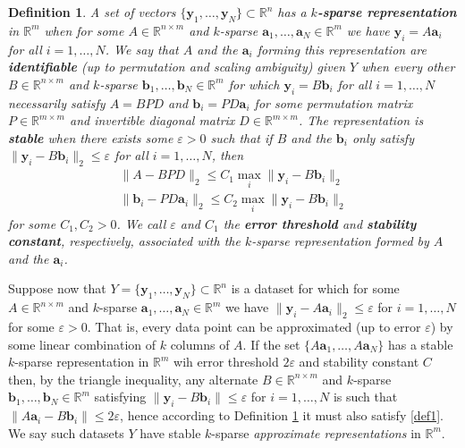 \documentclass[journal, onecolumn]{IEEEtran}
\newtheorem{definition}{Definition}
\begin{document}
\begin{definition}\label{Uniqueness}
A set of vectors $\{\mathbf{y}_1, \ldots, \mathbf{y}_N\} \subset \mathbb{R}^n$ has a \textbf{$k$-sparse representation} in $\mathbb{R}^m$ when for some $A \in \mathbb{R}^{n \times m}$ and $k$-sparse $\mathbf{a}_1, \ldots, \mathbf{a}_N \in \mathbb{R}^m$ we have $\mathbf{y}_i = A\mathbf{a}_i$ for all $i = 1, \ldots, N$. We say that $A$ and the $\mathbf{a}_i$ forming this representation are \textbf{identifiable} (up to permutation and scaling ambiguity) given $Y$ when every other $B \in \mathbb{R}^{n \times m}$ and $k$-sparse $\mathbf{b}_1, \ldots, \mathbf{b}_N \in \mathbb{R}^m$ for which $\mathbf{y}_i = B\mathbf{b}_i$ for all $i = 1, \ldots, N$ necessarily satisfy $A = BPD$ and $\mathbf{b}_i = PD\mathbf{a}_i$ for some permutation matrix $P \in \mathbb{R}^{m \times m}$ and invertible diagonal matrix $D \in \mathbb{R}^{m \times m}$. The representation is \textbf{stable} when there exists some $\varepsilon > 0$ such that if $B$ and the $\mathbf{b}_i$ only satisfy $\|\mathbf{y}_i - B\mathbf{b}_i\|_2 \leq \varepsilon$ for all $i = 1, \ldots, N$, then
\begin{align}\label{def1}
\|A - BPD\|_2 \leq C_1 \max_i \|\mathbf{y}_i - B\mathbf{b}_i\|_2 \\
\|\mathbf{b}_i - PD\mathbf{a}_i\|_2 \leq C_2 \max_i \|\mathbf{y}_i - B\mathbf{b}_i\|_2
\end{align}
for some $C_1, C_2>0$. We call $\varepsilon$ and $C_1$ the \textbf{error threshold} and \textbf{stability constant}, respectively, associated with the $k$-sparse representation formed by $A$ and the $\mathbf{a}_i$.
\end{definition}

Suppose now that $Y = \{\mathbf{y}_1, \ldots, \mathbf{y}_N\} \subset \mathbb{R}^n$ is a dataset for which for some $A \in \mathbb{R}^{n \times m}$ and $k$-sparse $\mathbf{a}_1, \ldots, \mathbf{a}_N \in \mathbb{R}^m$ we have $\|\mathbf{y}_i - A\mathbf{a}_i\|_2 \leq \varepsilon$ for $i = 1, \ldots, N$ for some $\varepsilon > 0$. That is, every data point can be approximated (up to error $\varepsilon$) by some linear combination of $k$ columns of $A$. If the set $\{A\mathbf{a}_1, \ldots, A\mathbf{a}_N\}$ has a stable $k$-sparse representation in $\mathbb{R}^m$ wih error threshold $2\varepsilon$ and stability constant $C$ then, by the triangle inequality, any alternate $B \in \mathbb{R}^{n \times m}$ and $k$-sparse $\mathbf{b}_1, \ldots, \mathbf{b}_N \in \mathbb{R}^m$ satisfying $\|\mathbf{y}_i - B\mathbf{b}_i\| \leq \varepsilon$ for $i = 1, \ldots, N$ is such that $\|A\mathbf{a}_i - B\mathbf{b}_i\| \leq 2\varepsilon$, hence according to Definition \ref{Uniqueness} it must also satisfy \eqref{def1}. We say such datasets $Y$ have stable $k$-sparse \emph{approximate representations} in $\mathbb{R}^m$.
\end{document}
